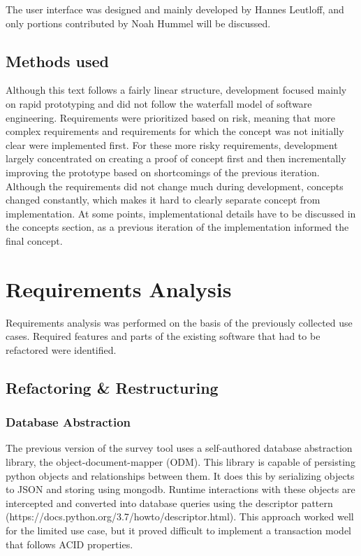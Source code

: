 \documentclass[a4paper,11pt]{article}
\begin{document}
            The user interface was designed and mainly developed by Hannes Leutloff, and
            only portions contributed by Noah Hummel will be discussed.

        \subsection{Methods used}
            Although this text follows a fairly linear structure, development focused
            mainly on rapid prototyping and did not follow the waterfall model of
            software engineering. Requirements were prioritized
            based on risk, meaning that more complex requirements and requirements for
            which the concept was not initially clear were implemented first.
            For these more risky requirements, development largely concentrated
            on creating a proof of concept first and then incrementally improving
            the prototype based on shortcomings of the previous iteration.
            Although the requirements did not change much during development,
            concepts changed constantly, which makes it hard to clearly
            separate concept from implementation. At some points, implementational
            details have to be discussed in the concepts section, as a previous
            iteration of the implementation informed the final concept.

        \section{Requirements Analysis}
           Requirements analysis was performed on the basis of the previously collected use cases.
           Required features and parts of the existing software that
           had to be refactored were identified.

        \subsection{Refactoring \& Restructuring}
           \subsubsection{Database Abstraction}
           The previous version of the survey tool uses a self-authored database abstraction library,
           the object-document-mapper (ODM). This library is capable of persisting python objects
           and relationships between them. It does this by serializing objects to JSON and storing 
           using mongodb. Runtime interactions with these objects are intercepted and converted into 
           database queries using the descriptor pattern (https://docs.python.org/3.7/howto/descriptor.html).
           This approach worked well for the limited use case, but it proved difficult to implement
           a transaction model that follows ACID properties.
\end{document}
